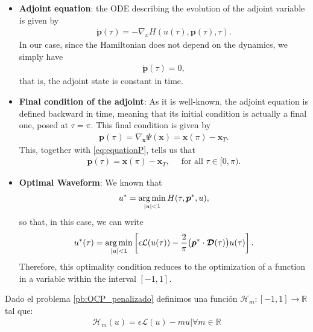 \begin{itemize}
    \item[1.] \textbf{Adjoint equation}: the ODE describing the evolution of the adjoint variable is given by 
    \begin{align*}
    	\dot{\bm{p}}(\tau) = -\nabla_x H(u(\tau),\bm{p}(\tau),\tau).
    \end{align*}
    In our case, since the Hamiltonian does not depend on the dynamics, we simply have
    \begin{align}\label{eq:equationP}
    	\dot{\bm{p}}(\tau) = 0,
    \end{align}
	that is, the adjoint state is constant in time.
	
	\item[2.] \textbf{Final condition of the adjoint}: As it is well-known, the adjoint equation is defined backward in time, meaning that its initial condition is actually a final one, posed at $\tau=\pi$. This final condition is given by 
    \begin{align*}
    	\bm{p}(\pi) = \nabla_{\bm{x}} \Psi(\bm{x}) = \bm{x}(\pi) - \bm{x}_T.
    \end{align*} 
	This, together with \eqref{eq:equationP}, tells us that
	\begin{align*}
		\bm{p}(\tau) = \bm{x}(\pi) - \bm{x}_T, \quad \mbox{ for all }\tau\in [0,\pi).
	\end{align*} 
    
    \item[3.] \textbf{Optimal  Waveform}: We known that 
    \begin{align*}
    	u^* = \operatorname*{arg\,min}_{|u|<1} H(\tau,\bm{p}^*,u),
    \end{align*}
	so that, in this case, we can write
    \begin{gather}
        u^*(\tau) = \operatorname*{arg\,min}_{|u|<1}  \left[\epsilon \mathcal{L}(u(\tau)) - \frac 2\pi \big(\bm{p}^* \cdot \bm{\mathcal{D}}(\tau)\big) u(\tau) \right].
    \end{gather}
    Therefore, this optimality condition reduces to the optimization of a function in a variable within the interval $ [- 1,1] $. 
\end{itemize}
\vspace{1em}
\begin{definition}
    Dado el problema \ref{pb:OCP_penalizado} definimos una función $\mathcal{H}_m:[-1,1]\rightarrow \mathbb{R}$ tal que:
    \begin{gather}\label{Hm}
        \mathcal{H}_m(u) = \epsilon \mathcal{L}(u) - mu  |  \forall m \in \mathbb{R}
    \end{gather}
\end{definition}
